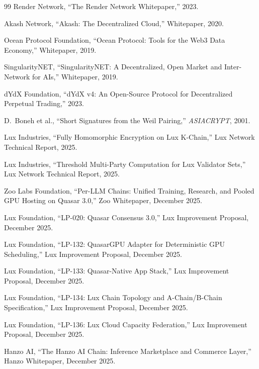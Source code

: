 \begin{thebibliography}{99}
Render Network, ``The Render Network Whitepaper,'' 2023.

Akash Network, ``Akash: The Decentralized Cloud,'' Whitepaper, 2020.

Ocean Protocol Foundation, ``Ocean Protocol: Tools for the Web3 Data Economy,'' Whitepaper, 2019.

SingularityNET, ``SingularityNET: A Decentralized, Open Market and Inter-Network for AIs,'' Whitepaper, 2019.

dYdX Foundation, ``dYdX v4: An Open-Source Protocol for Decentralized Perpetual Trading,'' 2023.

D.~Boneh et al., ``Short Signatures from the Weil Pairing,'' \textit{ASIACRYPT}, 2001.

Lux Industries, ``Fully Homomorphic Encryption on Lux K-Chain,'' Lux Network Technical Report, 2025.

Lux Industries, ``Threshold Multi-Party Computation for Lux Validator Sets,'' Lux Network Technical Report, 2025.

Zoo Labs Foundation, ``Per-LLM Chains: Unified Training, Research, and Pooled GPU Hosting on Quasar 3.0,'' Zoo Whitepaper, December 2025.

Lux Foundation, ``LP-020: Quasar Consensus 3.0,'' Lux Improvement Proposal, December 2025.

Lux Foundation, ``LP-132: QuasarGPU Adapter for Deterministic GPU Scheduling,'' Lux Improvement Proposal, December 2025.

Lux Foundation, ``LP-133: Quasar-Native App Stack,'' Lux Improvement Proposal, December 2025.

Lux Foundation, ``LP-134: Lux Chain Topology and A-Chain/B-Chain Specification,'' Lux Improvement Proposal, December 2025.

Lux Foundation, ``LP-136: Lux Cloud Capacity Federation,'' Lux Improvement Proposal, December 2025.

Hanzo AI, ``The Hanzo AI Chain: Inference Marketplace and Commerce Layer,'' Hanzo Whitepaper, December 2025.

\end{thebibliography}

